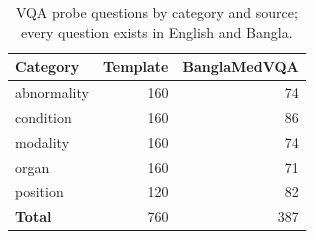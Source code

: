 \begin{table}[!htbp]
\centering
\small
\begin{tabular}{lrr}
\toprule
Category & Template & BanglaMedVQA \\
\midrule
abnormality & 160 & 74 \\
condition & 160 & 86 \\
modality & 160 & 74 \\
organ & 160 & 71 \\
position & 120 & 82 \\
\midrule
\textbf{Total} & 760 & 387 \\
\bottomrule
\end{tabular}
\caption{VQA probe questions by category and source; every question exists in English and Bangla.}
\label{tab:probe}
\end{table}
